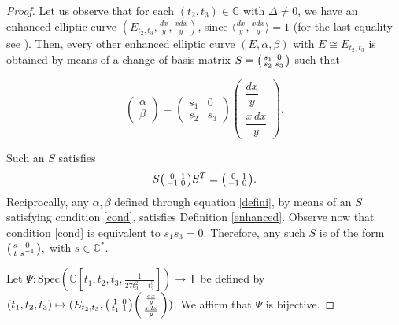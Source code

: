 \documentclass{article}
\numberwithin{equation}{section}
\numberwithin{figure}{section}
\theoremstyle{plain}
\theoremstyle{definition}
\numberwithin{equation}{section}
\newtheorem[S, bodystyle=\normalfont\noindent]{defiS}{Definition}[section]
\begin{document}
\begin{proof}

Let us observe that for each $(t_2,t_3)\in \mathbb{C}$ with $\Delta\neq 0$, we have an enhanced elliptic curve $(E_{t_2,t_3},\frac{dx}{y},\frac{xdx}{y})$, since $\langle \frac{dx}{y},\frac{xdx}{y}\rangle=1$ (for the last equality see \parencite[\S 2.10]{mov12}). Then, every other enhanced elliptic curve $(E,\alpha,\beta)$ with $E\cong E_{t_2,t_3}$ is obtained by means of a change of basis matrix $S=\begin{psmallmatrix}s_1 & 0\\s_2 & s_3\end{psmallmatrix}$ such that 

\begin{equation}\label{defini}
\begin{pmatrix}\alpha \\ \beta\end{pmatrix} = \begin{pmatrix}s_1 & 0\\s_2 & s_3\end{pmatrix} \begin{pmatrix}\dfrac{dx}{y}\\ \dfrac{x\,dx}{y}\end{pmatrix}.
\end{equation}

Such an $S$ satisfies \begin{equation}\label{cond}S\begin{psmallmatrix}0 & 1\\  -1 & 0\end{psmallmatrix}S^T=\begin{psmallmatrix}0 & 1\\  -1 & 0\end{psmallmatrix}.\end{equation} Reciprocally, any $\alpha,\beta$ defined through equation \ref{defini}, by means of an $S$ satisfying condition \ref{cond}, satisfies Definition \ref{enhanced}. Observe now that condition \ref{cond} is equivalent to $s_1s_3=0$. Therefore, any such $S$ is of the form $\begin{psmallmatrix}s & 0\\  t & s^{-1}\end{psmallmatrix},$ with $s\in\mathbb{C}^{*}$.


Let $\Psi: \text{Spec}(\mathbb{C}[t_1,t_2,t_3,\frac{1}{27t_3^2-t_2^3}])\rightarrow \mathsf{T}$ be defined by $(t_1,t_2,t_3)\mapsto (E_{t_2,t_3},\begin{psmallmatrix}1 & 0\\  t_1 & 1\end{psmallmatrix}\begin{psmallmatrix}\frac{dx}{y} \\ \frac{xdx}{y}\end{psmallmatrix})$. We affirm that $\Psi$ is bijective. 



\end{proof}
\end{document}
